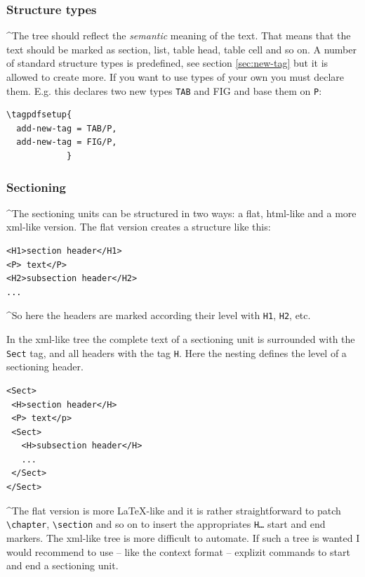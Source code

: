 \documentclass[DIV=12,parskip=half-,bibliography=totoc]{scrartcl}
\begin{document}
\subsubsection{Structure types}
\TagP^The tree should reflect the \emph{semantic} meaning of the text. That means that the text should be marked as section, list, table head, table cell and so on. A number of standard structure types is predefined, see section \ref{sec:new-tag} but it is allowed to create more. If you want to use types of your own you must declare them. E.g. this declares two new types \texttt{TAB} and {FIG} and base them on \texttt{P}:\TagPend

\begin{lstlisting}
\tagpdfsetup{
  add-new-tag = TAB/P,
  add-new-tag = FIG/P,
            }
\end{lstlisting}
\tagmcend\tagstructend

\subsubsection{Sectioning}
\TagP^The sectioning units can be structured in two ways: a flat, html-like and a more xml-like version.
The flat version creates a structure like this:\TagPend

\begin{lstlisting}
<H1>section header</H1>
<P> text</P>
<H2>subsection header</H2>
...
\end{lstlisting}
\tagmcend\tagstructend

\TagP^So here the headers are marked according their level with \texttt{H1}, \texttt{H2}, etc.

\TagP In the xml-like tree the complete text of a sectioning unit is surrounded with the \texttt{Sect} tag, and all headers with the tag \texttt{H}. Here the nesting defines the level of a sectioning header.\TagPend

\begin{lstlisting}
<Sect>
 <H>section header</H>
 <P> text</p>
 <Sect>
   <H>subsection header</H>
   ...
 </Sect>
</Sect>
\end{lstlisting}
\tagmcend\tagstructend

\TagP^The flat version is more \LaTeX-like and it is rather straightforward to patch \verb+\chapter+, \verb+\section+ and so on to insert the appropriates \texttt{H\ldots} start and end markers. The xml-like tree is more difficult to automate. If such a tree is wanted I would recommend to use -- like the context format -- explizit commands to start and end a sectioning unit.
\TagPend
\end{document}
